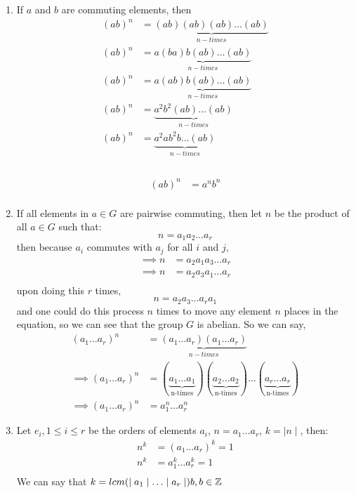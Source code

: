 \documentclass[12pt]{article}
\begin{document}
\newpage
\begin{solution}
    \bbni
    \bbni
    \begin{enumerate}
        \item If $a$ and $b$ are commuting elements, then 
        \begin{align*}
            (ab) ^ n &= \underbrace{(ab)(ab)(ab)\ldots(ab)}_{n-times} \\
            (ab)^n &= \underbrace{a(ba)b(ab)\ldots(ab)}_{n-times} \\
            (ab)^n &= \underbrace{a(ab)b(ab)\ldots(ab)}_{n-times} \\
            (ab)^n &= \underbrace{a^2b^2(ab)\ldots(ab)}_{n-times} \\
            (ab)^n &= \underbrace{a^2ab^2b\ldots(ab)}_{n-times} \\
        \end{align*}
        \\
        \begin{align*}
            (ab)^n &= a^nb^n \\
        \end{align*}

        \item If all elements in $a \in G$ are pairwise commuting, then let $n$ be the product of all $a \in G$ such that: 
        \[n = a_1a_2\ldots a_r\]
        then because $a_i$ commutes with $a_j$ for all $i$ and $j$, 
        \begin{align*}
        \implies n &= a_2a_1a_3\ldots a_r \\
        \implies n &= a_2a_3a_1\ldots a_r \\
        \end{align*}
        upon doing this $r$ times, 
        \[n = a_2a_3\ldots a_ra_1\]
        and one could do this process $n$ times to move any element $n$ places in the equation, so we can see that the group $G$ is abelian. So we can say, 
        \begin{align*}
            (a_1\ldots a_r)^n &= \underbrace{(a_1\ldots a_r)(a_1\ldots a_r)}_{n-times}\\
            \implies (a_1\ldots a_r)^n &= (\underbrace{a_1\ldots a_1}_{\text{n-times}})(\underbrace{a_2\ldots a_2}_{\text{n-times}})\ldots (\underbrace{a_r\ldots a_r}_{\text{n-times}}) \\
            \implies (a_1\ldots a_r)^n &= a_1^n\ldots a_r^n
        \end{align*}
        \item Let $e_i, 1\leq i \leq r$ be the orders of elements $a_i$, $n = a_1\ldots a_r$, $k = \mid n \mid$, then: 
        \begin{align*}
            n^k &= (a_1\ldots a_r)^k = 1 \\
            n^k &= a^k_1\ldots a_r^k = 1 \\ 
        \end{align*}
        We can say that $k = lcm (\mid a_1 \mid \ldots \mid a_r\mid)b, b \in \mathbb Z$
        

\end{enumerate}
\end{solution}
\end{document}
